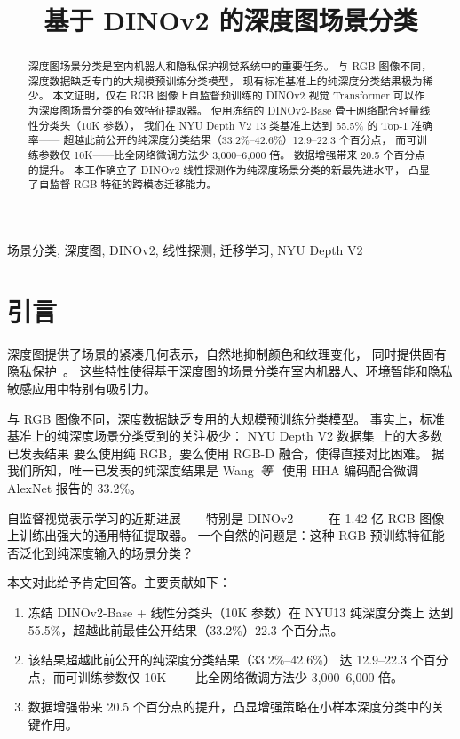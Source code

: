 \documentclass[conference, a4paper]{IEEEtran}
\title{基于 DINOv2 的深度图场景分类}
\author{
    \IEEEauthorblockN{丁驿}
    \IEEEauthorblockA{武汉理工大学国际教育学院 \\
        Email: dyvertin@outlook.com
    }
}
\begin{document}
\maketitle

\begin{abstract}
深度图场景分类是室内机器人和隐私保护视觉系统中的重要任务。
与 RGB 图像不同，深度数据缺乏专门的大规模预训练分类模型，
现有标准基准上的纯深度分类结果极为稀少。
本文证明，仅在 RGB 图像上自监督预训练的 DINOv2 视觉 Transformer
可以作为深度图场景分类的有效特征提取器。
使用冻结的 DINOv2-Base 骨干网络配合轻量线性分类头（10K 参数），
我们在 NYU Depth V2 13 类基准上达到 55.5\% 的 Top-1 准确率——
超越此前公开的纯深度分类结果（33.2\%--42.6\%）12.9--22.3 个百分点，
而可训练参数仅 10K——比全网络微调方法少 3,000--6,000 倍。
数据增强带来 20.5 个百分点的提升。
本工作确立了 DINOv2 线性探测作为纯深度场景分类的新最先进水平，
凸显了自监督 RGB 特征的跨模态迁移能力。
\end{abstract}

\begin{IEEEkeywords}
场景分类, 深度图, DINOv2, 线性探测, 迁移学习, NYU Depth V2
\end{IEEEkeywords}

\section{引言}

深度图提供了场景的紧凑几何表示，自然地抑制颜色和纹理变化，
同时提供固有隐私保护~\cite{robotics_depth}。
这些特性使得基于深度图的场景分类在室内机器人、环境智能和隐私敏感应用中特别有吸引力。

与 RGB 图像不同，深度数据缺乏专用的大规模预训练分类模型。
事实上，标准基准上的纯深度场景分类受到的关注极少：
NYU Depth V2 数据集~\cite{nyu_depth}上的大多数已发表结果
要么使用纯 RGB，要么使用 RGB-D 融合，使得直接对比困难。
据我们所知，唯一已发表的纯深度结果是 Wang~\textit{等}~\cite{wang3d}
使用 HHA 编码配合微调 AlexNet 报告的 33.2\%。

自监督视觉表示学习的近期进展——特别是 DINOv2~\cite{dinov2}——
在 1.42 亿 RGB 图像上训练出强大的通用特征提取器。
一个自然的问题是：这种 RGB 预训练特征能否泛化到纯深度输入的场景分类？

本文对此给予肯定回答。主要贡献如下：

\begin{enumerate}
    \item 冻结 DINOv2-Base + 线性分类头（10K 参数）在 NYU13 纯深度分类上
          达到 55.5\%，超越此前最佳公开结果（33.2\%）22.3 个百分点。
    \item 该结果超越此前公开的纯深度分类结果（33.2\%--42.6\%）
          达 12.9--22.3 个百分点，而可训练参数仅 10K——
          比全网络微调方法少 3,000--6,000 倍。
    \item 数据增强带来 20.5 个百分点的提升，凸显增强策略在小样本深度分类中的关键作用。
\end{enumerate}
\end{document}
